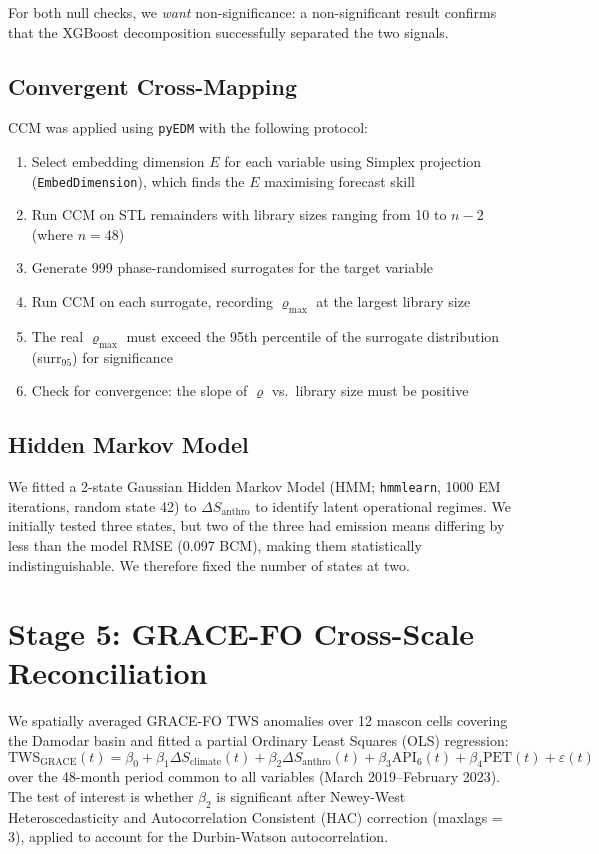 \documentclass[12pt,a4paper,oneside]{report}
\newcommand{\dSclim}{\Delta S_{\mathrm{climate}}}
\newcommand{\dSanthro}{\Delta S_{\mathrm{anthro}}}
\begin{document}
For both null checks, we \textit{want} non-significance: a non-significant
result confirms that the XGBoost decomposition successfully separated the
two signals.

\subsection{Convergent Cross-Mapping}

CCM was applied using \texttt{pyEDM} with the following protocol:
\begin{enumerate}[leftmargin=*]
  \item Select embedding dimension $E$ for each variable using Simplex
    projection (\texttt{EmbedDimension}), which finds the $E$ maximising
    forecast skill
  \item Run CCM on STL remainders with library sizes ranging from 10 to
    $n - 2$ (where $n = 48$)
  \item Generate 999 phase-randomised surrogates for the target variable
  \item Run CCM on each surrogate, recording $\varrho_{\max}$ at the largest
    library size
  \item The real $\varrho_{\max}$ must exceed the 95th percentile of the
    surrogate distribution (surr$_{95}$) for significance
  \item Check for convergence: the slope of $\varrho$ vs.\ library size
    must be positive
\end{enumerate}

\subsection{Hidden Markov Model}

We fitted a 2-state Gaussian Hidden Markov Model (HMM; \texttt{hmmlearn}, 1000 EM iterations, random
state 42) to $\dSanthro$ to identify latent operational regimes.
We initially tested three states, but two of the three had emission means
differing by less than the model RMSE (0.097 BCM), making them statistically
indistinguishable. We therefore fixed the number of states at two.

\section{Stage 5: GRACE-FO Cross-Scale Reconciliation}

We spatially averaged GRACE-FO TWS anomalies over 12 mascon cells covering
the Damodar basin and fitted a partial Ordinary Least Squares (OLS) regression:
\begin{equation}
  \mathrm{TWS}_{\mathrm{GRACE}}(t) =
    \beta_0 + \beta_1 \dSclim(t) + \beta_2 \dSanthro(t)
    + \beta_3 \mathrm{API}_6(t) + \beta_4 \mathrm{PET}(t) + \varepsilon(t)
  \label{eq:grace}
\end{equation}
over the 48-month period common to all variables (March 2019--February 2023).
The test of interest is whether $\beta_2$ is significant after Newey-West
Heteroscedasticity and Autocorrelation Consistent (HAC) correction
(maxlags = 3), applied to account for the Durbin-Watson autocorrelation.
\end{document}
